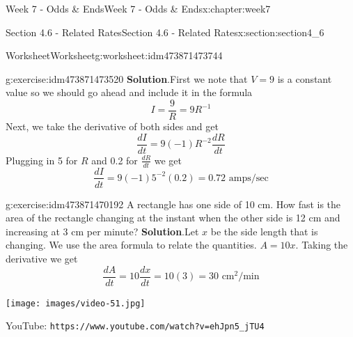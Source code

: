 \documentclass[oneside,10pt,]{book}
\newcommand{\blocktitlefont}{\relax}
\newcommand{\mono}[1]{\texttt{#1}}
\numberwithin{equation}{section}
\newlength{\qrsize}
\newlength{\previewwidth}
\begin{document}
\begin{chapterptx}{Week 7 - Odds \& Ends}{}{Week 7 - Odds \& Ends}{}{}{x:chapter:week7}
\begin{sectionptx}{Section 4.6 - Related Rates}{}{Section 4.6 - Related Rates}{}{}{x:section:section4_6}
\begin{worksheet-subsection}{Worksheet}{}{Worksheet}{}{}{g:worksheet:idm473871473744}
\begin{divisionexercise}{1}{}{}{g:exercise:idm473871473520}
\textbf{\blocktitlefont Solution}.\hypertarget{g:solution:idm473871470448}{}\quad{}First we note that \(V=9\) is a constant value so we should go ahead and include it in the formula%
\begin{equation*}
I = \frac 9R = 9R^{-1} 
\end{equation*}
Next, we take the derivative of both sides and get%
\begin{equation*}
\frac{dI}{dt} = 9(-1)R^{-2}\frac{dR}{dt} 
\end{equation*}
Plugging in 5 for \(R\) and 0.2 for \(\frac{dR}{dt}\) we get%
\begin{equation*}
\frac{dI}{dt} = 9(-1)5^{-2}(0.2) = 0.72 \text{ amps/sec}
\end{equation*}
%
\end{divisionexercise}%
%
\begin{divisionexercise}{2}{}{}{g:exercise:idm473871470192}%
A rectangle has one side of 10 cm. How fast is the area of the rectangle changing at the instant when the other side is 12 cm and increasing at 3 cm per minute?%
\textbf{\blocktitlefont Solution}.\hypertarget{g:solution:idm473871466592}{}\quad{}Let \(x\) be the side length that is changing. We use the area formula to relate the quantities. \(A=10x\). Taking the derivative we get%
\begin{equation*}
\frac{dA}{dt} = 10 \frac{dx}{dt} = 10(3) = 30 \text{ cm}^2\text{/min}
\end{equation*}
%
\end{divisionexercise}%
\end{worksheet-subsection}
\restoregeometry
\setlength{\qrsize}{9em}
\setlength{\previewwidth}{\linewidth}
\addtolength{\previewwidth}{-\qrsize}
\begin{tcbraster}[raster columns=2, raster column skip=1pt, raster halign=center, raster force size=false, raster left skip=0pt, raster right skip=0pt]%
\begin{tcolorbox}[previewstyle, width=\previewwidth]%
\texttt{[image: images/video-51.jpg]}%
\end{tcolorbox}%
\begin{tcolorbox}[qrstyle]%
{\hypersetup{urlcolor=black}}%
\end{tcolorbox}%
\begin{tcolorbox}[captionstyle]%
\small YouTube: \mono{https://www.youtube.com/watch?v=ehJpn5\_jTU4}\end{tcolorbox}%
\end{tcbraster}%
\end{sectionptx}
\end{chapterptx}
\end{document}
